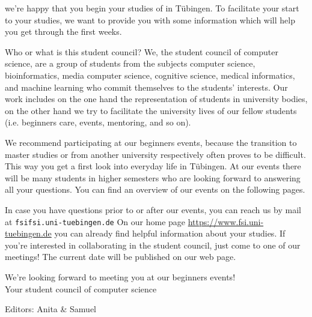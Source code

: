 \thispagestyle{firststyle}
we're happy that you begin your studies of \studiengang in Tübingen.
To facilitate your start to your studies, we want to provide you with some information which will help you get through the first weeks.

Who or what is this \glqq student council\grqq? We, the student council of computer science, are a group of students from the subjects computer science, bioinformatics, media computer science, cognitive science, medical informatics, and machine learning
who commit themselves to the students' interests. Our work includes on the one hand the representation of students in university bodies, on the other hand we try to facilitate the university lives of our fellow students (i.e. beginners care,
events, mentoring, and so on).

\ifmaster
    \ifml
We recommend participating at our beginners events, because the transition to master studies or from another university respectively often proves to be difficult. This way you get a first look into everyday life in Tübingen.
    \fi
\fi
At our events there will be many students in higher semesters who are looking forward to answering all your questions. You can find an overview of our events on the following pages.

In case you have questions prior to or after our events, you can reach us by mail at \texttt{fsi\At fsi.uni-tuebingen.de}
On our home page
\url{https://www.fsi.uni-tuebingen.de} you can already find helpful information about your studies. If you're interested in collaborating in the student council, just come to one of our meetings! The current date will be published on our web page.

We're looking forward to meeting you at our beginners events!\\
Your student council of computer science
\par\hfill{\footnotesize Editors: Anita \& Samuel}
\vfill

